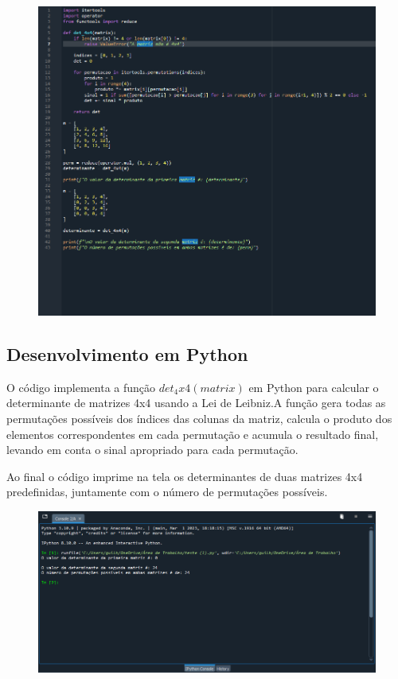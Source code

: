 \begin{figure}[!htpb]
    \centering
    \includegraphics[width=170mm]{code.png}
\end{figure}

\newpage

\begin{center}
\section{\Large Desenvolvimento em Python}
\end{center}

O código implementa a função $det_4x4(matrix)$ em Python para calcular o determinante de matrizes 4x4 usando a Lei de Leibniz.A função gera todas as permutações possíveis dos índices das colunas da matriz, calcula o produto dos elementos correspondentes em cada permutação e acumula o resultado final, levando em conta o sinal apropriado para cada permutação. 

Ao final o código imprime na tela os determinantes de duas matrizes 4x4 predefinidas, juntamente com o número de permutações possíveis.

\vspace{1cm}

\begin{figure}[!htpb]
    \centering
    \includegraphics[width=170mm]{console.png}
\end{figure}
